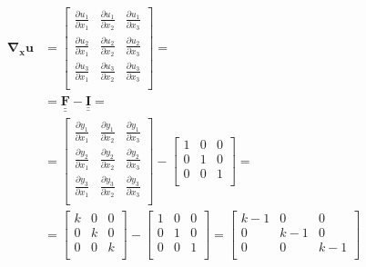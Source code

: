 \documentclass
[
a4paper,                      %
twoside,					  %
12pt,                         %
abstract,		      %
fleqn,                        %
]
{scrartcl} %
\begin{document}
\begin{equation}
\begin{aligned}
\mathbf{\nabla_{x}u}&=\begin{bmatrix}
\frac{\partial u_{1}}{\partial x_{1}}&\frac{\partial u_{1}}{\partial x_{2}}&\frac{\partial u_{1}}{\partial x_{3}}\\[5pt]
\frac{\partial u_{2}}{\partial x_{1}}&\frac{\partial u_{2}}{\partial x_{2}}&\frac{\partial u_{2}}{\partial x_{3}}\\[5pt]
\frac{\partial u_{3}}{\partial x_{1}}&\frac{\partial u_{3}}{\partial x_{2}}&\frac{\partial u_{3}}{\partial x_{3}}\\[5pt]
\end{bmatrix}=\\
&=\mathbf{\underline{\underline{F}}}-\mathbf{\underline{\underline{I}}}=\\
&=\begin{bmatrix}
\frac{\partial y_{1}}{\partial x_{1}}&\frac{\partial y_{1}}{\partial x_{2}}&\frac{\partial y_{1}}{\partial x_{3}}\\[5pt]
\frac{\partial y_{2}}{\partial x_{1}}&\frac{\partial y_{2}}{\partial x_{2}}&\frac{\partial y_{2}}{\partial x_{3}}\\[5pt]
\frac{\partial y_{3}}{\partial x_{1}}&\frac{\partial y_{3}}{\partial x_{2}}&\frac{\partial y_{3}}{\partial x_{3}}\\[5pt]
\end{bmatrix}-\begin{bmatrix}
1&0&0\\[5pt]
0&1&0\\[5pt]
0&0&1\\[5pt]\end{bmatrix}=\\
&=\begin{bmatrix}
k&0&0\\[5pt]
0&k&0\\[5pt]
0&0&k\\[5pt]\end{bmatrix}-\begin{bmatrix}
1&0&0\\[5pt]
0&1&0\\[5pt]
0&0&1\\[5pt]\end{bmatrix}=\begin{bmatrix}
k-1&0&0\\[5pt]
0&k-1&0\\[5pt]
0&0&k-1\\[5pt]\end{bmatrix}
\end{aligned}
\end{equation}
\end{document}
